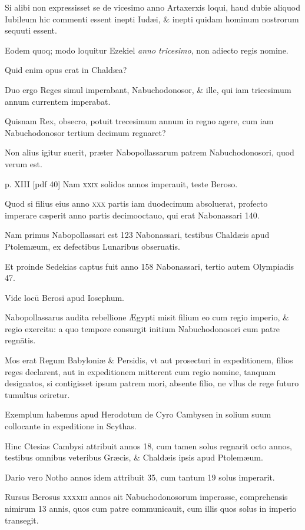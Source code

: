 \begin{parnumbers}
Si alibi non expressisset se de vicesimo anno Artaxerxis loqui, haud
dubie aliquod Iubileum hic commenti essent inepti Iudæi, \& inepti
quidam hominum nostrorum sequuti essent.

Eodem quoq; modo
loquitur Ezekiel \textit{anno tricesimo}, non adiecto regis nomine.

Quid enim opus erat in Chaldæa?

Duo ergo Reges simul imperabant,
Nabuchodonosor, \& ille, qui iam tricesimum annum currentem
imperabat.

Quisnam Rex, obsecro, potuit trecesimum annum in regno
agere, cum iam Nabuchodonosor tertium decimum regnaret?

Non alius igitur suerit, præter Nabopollassarum patrem Nabuchodonosori,
quod verum est.

\clearpage
p. XIII [pdf 40]
Nam \textsc{xxix} solidos annos imperauit,
teste Beroso.

Quod si filius eius anno \textsc{xxx} partis iam duodecimum
absoluerat, profecto imperare cæperit anno partis decimooctauo,
qui erat Nabonassari 140.

Nam primus Nabopollassari est 123 Nabonassari,
testibus Chaldæis apud Ptolemæum, ex defectibus Lunaribus
obseruatis.

Et proinde Sedekias captus fuit anno 158 Nabonassari,
tertio autem Olympiadis 47.

Vide locū Berosi apud Iosephum.

Nabopollassarus audita rebellione Ægypti misit filium eo
cum regio imperio, \& regio exercitu: a quo tempore consurgit initium
Nabuchodonosori cum patre regnātis.

Mos erat Regum Babyloniæ
\& Persidis, vt aut prosecturi in expeditionem, filios reges declarent,
aut in expeditionem mitterent cum regio nomine, tanquam
designatos, si contigisset ipsum patrem mori, absente filio, ne
vllus de rege futuro tumultus oriretur.

Exemplum habemus apud
Herodotum de Cyro Cambysen in solium suum collocante in expeditione
in Scythas.

Hinc Ctesias Cambysi attribuit annos 18,
cum tamen solus regnarit octo annos, testibus omnibus veteribus
Græcis, \& Chaldæis ipsis apud Ptolemæum.

Dario vero Notho annos
idem attribuit 35, cum tantum 19 solus imperarit.

Rursus Berosus
\textsc{xxxxiii} annos ait Nabuchodonosorum imperasse, comprehensis
nimirum 13 annis, quos cum patre communicauit, cum
illis quos solus in imperio transegit.


\end{parnumbers}
